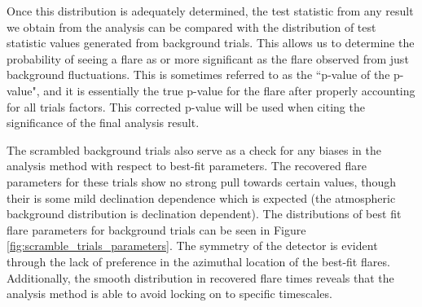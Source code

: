\documentclass{gatech-thesis}
\begin{document}
Once this distribution is adequately determined, the test statistic from any result we obtain from the analysis can be compared with the distribution of test statistic values generated from background trials. This allows us to determine the probability of seeing a flare as or more significant as the flare observed from just background fluctuations. This is sometimes referred to as the ``p-value of the p-value", and it is essentially the true p-value for the flare after properly accounting for all trials factors. This corrected p-value will be used when citing the significance of the final analysis result. 

The scrambled background trials also serve as a check for any biases in the analysis method with respect to best-fit parameters. The recovered flare parameters for these trials show no strong pull towards certain values, though their is some mild declination dependence which is expected (the atmospheric background distribution is declination dependent). The distributions of best fit flare parameters for background trials can be seen in Figure \ref{fig:scramble_trials_parameters}. The symmetry of the detector is evident through the lack of preference in the azimuthal location of the best-fit flares. Additionally, the smooth distribution in recovered flare times reveals that the analysis method is able to avoid locking on to specific timescales.
\end{document}
